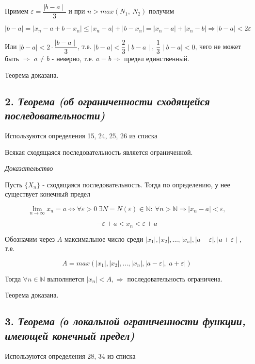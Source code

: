 Примем ${\varepsilon} = {\dfrac{\mid  b - a\mid  }{3}}$ и при $n > max(N_1, \ N_2)$ получим

$$
| b - a|  = | x_n - a + b - x_n|  \leqslant | x_n - a|  + | b - x_n|  = | x_n - a|  + | x_n - b|  \Rightarrow | b - a|  < 2{\varepsilon}
$$

Или $\mid  b-a\mid   < 2 \cdot {\dfrac{\mid  b - a\mid  }{3}}$, т.е. $\mid  b-a\mid   < \dfrac{2}{3}\mid  b - a\mid  $, $\dfrac{1}{3}\mid  b-a\mid   < 0$, чего не может быть $\Rightarrow$ $a \neq b$ - неверно, т.е. $a = b \Rightarrow$ предел единственный.

Теорема доказана.
\newpage 
\subsection*{2. \textit{Теорема (об ограниченности сходящейся последовательности)}}
\begin{Quote2} 
\small\centering 

Используются определения 15, 24, 25, 26 из списка \end{Quote2} 

Всякая сходящаяся последовательность является ограниченной.
\vspace*{20pt} 

\textit{Доказательство}

Пусть $\{X_n\}$ - сходящаяся последовательность. Тогда по определению, у нее существует конечный предел

$$
\lim\limits_{n \to \infty}x_n = a \iff \forall {\varepsilon} > 0 \ \exists N = N({\varepsilon})\in \mathbb{N}: \ \forall n > \mathbb{N} \Rightarrow | x_n - a|  < {\varepsilon},
$$

$$
-{\varepsilon}+a < x_n < {\varepsilon} + a
$$

Обозначим через $A$ максимальное число среди $\mid  x_1\mid  , \mid  x_2\mid  , ..., \mid  x_n\mid  , \mid  a-{\varepsilon}\mid  , \mid  a + {\varepsilon}\mid  $, т.е.

$$
A = max(| x_1| , | x_2| , ..., | x_n| , | a-{\varepsilon}| , | a + {\varepsilon}| )
$$

Тогда $\forall n \in \mathbb{N}$ выполняется $\mid  x_n\mid   < A, \Rightarrow$ последовательность ограничена.

Теорема доказана.
\newpage 
\subsection*{3. \textit{Теорема (о локальной ограниченности функции, имеющей конечный предел)}}
\begin{Quote2} 
\small\centering 

Используются определения 28, 34 из списка \end{Quote2} 

